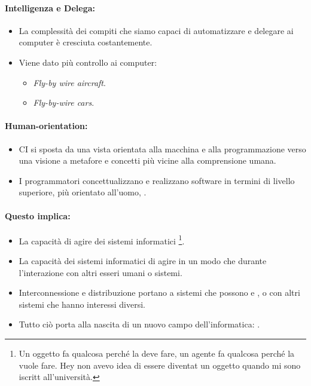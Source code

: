 \paragraph{Intelligenza e Delega:}

\begin{itemize}
  \item La complessità dei compiti che siamo capaci di automatizzare e delegare ai computer è cresciuta costantemente. 
  \item Viene dato più controllo ai computer: 
    \begin{itemize}
      \item \textit{Fly-by wire aircraft}. 
      \item \textit{Fly-by-wire cars}.
    \end{itemize}
\end{itemize}

\paragraph{Human-orientation:}

\begin{itemize}
  \item CI si sposta da una vista orientata alla macchina e alla programmazione verso una visione a metafore e concetti più vicine alla comprensione umana. 
  \item I programmatori concettualizzano e realizzano software in termini di livello superiore, più orientato all'uomo, .
\end{itemize}


\paragraph{Questo implica:}

\begin{itemize}
  \item La capacità di agire dei sistemi informatici \footnote{Un oggetto fa qualcosa perché la deve fare, un agente fa qualcosa perché la vuole fare. Hey non avevo idea di essere diventat un oggetto quando mi sono iscritt all'università.}. 
  \item La capacità dei sistemi informatici di agire in un modo che  durante l'interazione con altri esseri umani o sistemi.
  \item Interconnessione e distribuzione portano a sistemi che possono  e ,  o  con altri sistemi che hanno interessi diversi.
  \item Tutto ciò porta alla nascita di un nuovo campo dell'informatica: .
\end{itemize}

